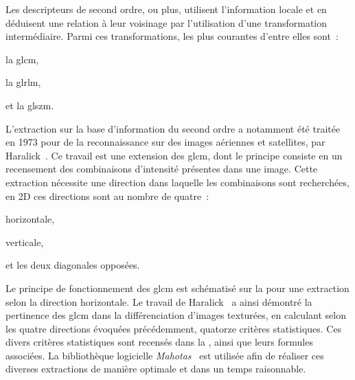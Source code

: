 Les descripteurs de second ordre, ou plus, utilisent l'information locale et en déduisent une relation à leur voisinage par l'utilisation d'une transformation intermédiaire. Parmi ces transformations, les plus courantes d'entre elles sont~:
\begin{inlinerate}
    \item la \gls{glcm},
    \item la \gls{glrlm},
    \item et la \gls{glszm}.
\end{inlinerate} 
L'extraction sur la base d'information du second ordre a notamment été traitée en 1973 pour de la reconnaissance sur des images aériennes et satellites, par Haralick~. Ce travail est une extension des \gls{glcm}, dont le principe consiste en un recensement des combinaisons d'intensité présentes dans une image. Cette extraction nécessite une direction dans laquelle les combinaisons sont recherchées, en 2D ces directions sont au nombre de quatre~:
\begin{inlinerate}
    \item horizontale,
    \item verticale,
    \item et les deux diagonales opposées.
\end{inlinerate}
Le principe de fonctionnement des \gls{glcm} est schématisé sur la  pour une extraction selon la direction horizontale. Le travail de Haralick~ a ainsi démontré la pertinence des \gls{glcm} dans la différenciation d'images texturées, en calculant selon les quatre directions évoquées précédemment, quatorze critères statistiques. Ces divers critères statistiques sont recensés dans la , ainsi que leurs formules associées. La bibliothèque logicielle \textit{Mahotas}~\cite{Mahotas2013} est utilisée afin de réaliser ces diverses extractions de manière optimale et dans un temps raisonnable.\par
 
